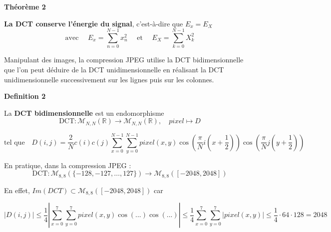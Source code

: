 \documentclass{article}
\newenvironment{mydefinition}[1]{%
  \begin{definitionbox}%
  \noindent\textbf{#1}\par
}{%
  \end{definitionbox}%
}
\begin{document}
\begin{mydefinition}{Théorème 2}
    \textbf{La DCT conserve l'énergie du signal}, c'est-à-dire que $E_x = E_X$ 
    \[ \text{avec } \quad E_x = \sum_{n=0}^{N-1} x_n^2 \quad \text{ et } \quad E_X = \sum_{k=0}^{N-1} X_k^2 \]
    
\end{mydefinition}
    
    

Manipulant des images, la compression JPEG utilise la DCT bidimensionnelle que l'on peut déduire de la DCT unidimensionnelle en réalisant la DCT unidimensionnelle successivement sur les lignes puis sur les colonnes.

\vspace{0.2cm}

\begin{mydefinition}{Definition 2}
    La \textbf{DCT bidimensionnelle} est un endomorphisme \[\text{DCT} : \mathcal{M}_{N,N}(\mathbb{R}) \rightarrow \mathcal{M}_{N,N}(\mathbb{R}), \quad pixel \mapsto D \]
    
    \[
        \text{tel que} \quad D(i,j) = \frac{2}{N} c(i) c(j) \sum_{x=0}^{N-1} \sum_{y=0}^{N-1} pixel(x,y) \cos \left( \frac{\pi}{N} i \left( x + \frac{1}{2} \right) \right) \cos \left( \frac{\pi}{N} j \left( y + \frac{1}{2} \right) \right)
    \]
\end{mydefinition}

En pratique, dans la compression JPEG : \[\text{DCT} : \mathcal{M}_{8,8}(\{-128, -127, \ldots, 127\}) \rightarrow \mathcal{M}_{8,8}([-2048, 2048])\]

En effet, $Im(DCT) \subset \mathcal{M}_{8,8}([-2048, 2048]) $ car

\[
\left| D(i, j)\right| \leq \frac{1}{4}\left| \sum_{x=0}^{7} \sum_{y=0}^{7} pixel(x, y) \cos(...) \cos(...) \right| \leq \frac{1}{4} \sum_{x=0}^{7} \sum_{y=0}^{7} \left| pixel(x, y) \right| \leq \frac{1}{4} \cdot 64 \cdot 128 = 2048
\]


\vspace{0.2cm}
\end{document}
